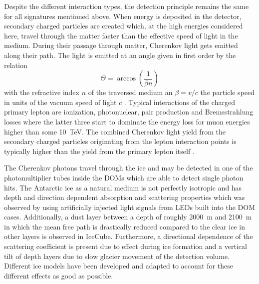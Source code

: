 Despite the different interaction types, the detection principle remains the same for all signatures mentioned above.
When energy is deposited in the detector, secondary charged particles are created which, at the high energies considered here, travel through the matter faster than the effective speed of light in the medium.
During their passage through matter, Cherenkov light gets emitted along their path.
The light is emitted at an angle given in first order by the relation
\begin{equation}
  \Theta = \arccos\left(\frac{1}{\beta n}\right)
\end{equation}
with the refractive index $n$ of the traversed medium an $\beta = v/c$ the particle speed in units of the vacuum speed of light $c$ .
Typical interactions of the charged primary lepton are ionization, photonuclear, pair production and Bremsstrahlung losses where the latter three start to dominate the energy loss for muon energies higher than some \SI{10}{\tera\eV}.
The combined Cherenkov light yield from the secondary charged particles originating from the lepton interaction points is typically higher than the yield from the primary lepton itself .

The Cherenkov photons travel through the ice and may be detected in one of the photomultiplier tubes inside the DOMs which are able to detect single photon hits.
The Antarctic ice as a natural medium is not perfectly isotropic and has depth and direction dependent absorption and scattering properties which was observed by using artificially injected light signals from LEDs built into the DOM cases.
Additionally, a dust layer between a depth of roughly \SI{2000}{\m} and \SI{2100}{\m} in which the mean free path is drastically reduced compared to the clear ice in other layers is observed in IceCube.
Furthermore, a directional dependence of the scattering coefficient is present due to effect during ice formation and a vertical tilt of depth layers due to slow glacier movement of the detection volume.
Different ice models have been developed and adapted to account for these different effects as good as possible.
